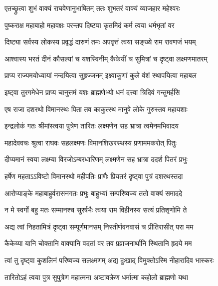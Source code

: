 
\twolineshloka
{एतच्छ्रुत्वा शुभं वाक्यं राघवेणानुभाषितम्}
{ततः शुभतरं वाक्यं व्याजहार महेश्वरः} %

\twolineshloka
{पुष्कराक्ष महाबाहो महावक्षः परन्तप}
{दिष्ट्या कृतमिदं कर्म त्वया धर्मभृतां वर} %

\twolineshloka
{दिष्ट्या सर्वस्य लोकस्य प्रवृद्धं दारुणं तमः}
{अपवृत्तं त्वया सङ्ख्ये राम रावणजं भयम्} %

\twolineshloka
{आश्वास्य भरतं दीनं कौसल्यां च यशस्विनीम्}
{कैकेयीं च सुमित्रां च दृष्ट्वा लक्ष्मणमातरम्} %

\twolineshloka
{प्राप्य राज्यमयोध्यायां नन्दयित्वा सुहृज्जनम्}
{इक्ष्वाकूणां कुले वंशं स्थापयित्वा महाबल} %

\twolineshloka
{इष्ट्वा तुरगमेधेन प्राप्य चानुत्तमं यशः}
{ब्राह्मणेभ्यो धनं दत्त्वा त्रिदिवं गन्तुमर्हसि} %

\twolineshloka
{एष राजा दशरथो विमानस्थः पिता तव}
{काकुत्स्थ मानुषे लोके गुरुस्तव महायशाः} %

\twolineshloka
{इन्द्रलोकं गतः श्रीमांस्त्वया पुत्रेण तारितः}
{लक्ष्मणेन सह भ्रात्रा त्वमेनमभिवादय} %

\twolineshloka
{महादेववचः श्रुत्वा राघवः सहलक्ष्मणः}
{विमानशिखरस्थस्य प्रणाममकरोत् पितुः} %

\twolineshloka
{दीप्यमानं स्वया लक्ष्म्या विरजोऽम्बरधारिणम्}
{लक्ष्मणेन सह भ्रात्रा ददर्श पितरं प्रभुः} %

\twolineshloka
{हर्षेण महताऽऽविष्टो विमानस्थो महीपतिः}
{प्राणैः प्रियतरं दृष्ट्वा पुत्रं दशरथस्तदा} %

\twolineshloka
{आरोप्याङ्के महाबाहुर्वरासनगतः प्रभुः}
{बाहुभ्यां सम्परिष्वज्य ततो वाक्यं समाददे} %

\twolineshloka
{न मे स्वर्गो बहु मतः सम्मानश्च सुरर्षभैः}
{त्वया राम विहीनस्य सत्यं प्रतिशृणोमि ते} %

\twolineshloka
{अद्य त्वां निहतामित्रं दृष्ट्वा सम्पूर्णमानसम्}
{निस्तीर्णवनवासं च प्रीतिरासीत् परा मम} %

\twolineshloka
{कैकेय्या यानि चोक्तानि वाक्यानि वदतां वर}
{तव प्रव्राजनार्थानि स्थितानि हृदये मम} %

\twolineshloka
{त्वां तु दृष्ट्वा कुशलिनं परिष्वज्य सलक्ष्मणम्}
{अद्य दुःखाद् विमुक्तोऽस्मि नीहारादिव भास्करः} %

\twolineshloka
{तारितोऽहं त्वया पुत्र सुपुत्रेण महात्मना}
{अष्टावक्रेण धर्मात्मा कहोलो ब्राह्मणो यथा} %

